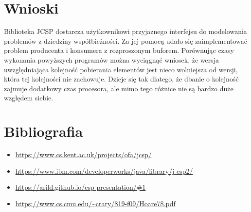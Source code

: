 \documentclass[12pt]{article}
\begin{document}
\newpage
\section{Wnioski}
Biblioteka JCSP dostarcza użytkownikowi przyjaznego interfejsu do modelowania problemów z dziedziny współbieżności. Za jej pomocą udało się zaimplementować problem producenta i konsumera z rozproszonym buforem. Porównując czasy wykonania powyższych programów można wyciągnąć wniosek, że wersja uwzględniająca kolejność pobierania elementów jest nieco wolniejsza od wersji, która tej kolejności nie zachowuje. Dzieje się tak dlatego, że dbanie o kolejność zajmuje dodatkowy czas procesora, ale mimo tego różnice nie są bardzo duże względem siebie.

\section{Bibliografia}
\begin{itemize}
    \item \url{https://www.cs.kent.ac.uk/projects/ofa/jcsp/}
    \item \url{https://www.ibm.com/developerworks/java/library/j-csp2/}
    \item \url{https://arild.github.io/csp-presentation/#1}
    \item \url{https://www.cs.cmu.edu/~crary/819-f09/Hoare78.pdf}
\end{itemize}
\end{document}
